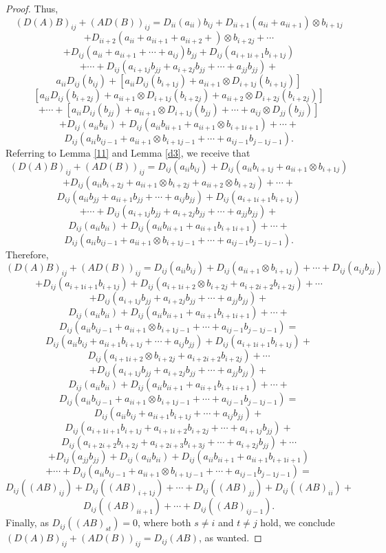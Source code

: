 \documentclass[12pt, reqno]{amsart}
\theoremstyle{definition}
\numberwithin{equation}{section}
\begin{document}
\begin{proof}
Thus, $$(D(A)B)_{ij}+(AD(B))_{ij}=D_{ii}(a_{ii})b_{ij}+D_{ii+1}(a_{ii}+a_{ii+1})\otimes b_{i+1j}$$$$+D_{ii+2}(a_{ii}+a_{ii+1}+a_{ii+2}+)\otimes b_{i+2j}+\cdots$$$$+D_{ij}(a_{ii}+a_{ii+1}+\cdots+a_{ij})b_{jj}+D_{ij}(a_{i+1i+1}b_{i+1j})$$$$+\cdots +D_{ij}(a_{i+1j}b_{jj}+a_{i+2j}b_{jj}+\cdots+a_{jj}b_{jj})+$$$$a_{ii} D_{ij}(b_{ij})+[a_{ii}  D_{ij}(b_{i+1j})+a_{ii+1}\otimes D_{i+1j}(b_{i+1j})]$$$$[a_{ii}  D_{ij}(b_{i+2j})+a_{ii+1}\otimes D_{i+1j}(b_{i+2j})+a_{ii+2}\otimes D_{i+2j}(b_ {i+2j})]$$$$+\cdots+[a_{ii}  D_{ij}(b_{jj})+a_{ii+1}\otimes D_{i+1j}(b_{jj})+\cdots+a_{ij}\otimes D_{jj}(b_{jj})]$$$$+D_{ij}(a_{ii}  b_{ii})+D_{ij}(a_{ii}  b_{ii+1}+a_{ii+1}\otimes b_{i+1i+1})+\cdots+$$$$D_{ij}(a_{ii}  b_{ij-1}+a_{ii+1}\otimes b_{i+1j-1}+\cdots + a_{ij-1}b_{j-1j-1}).$$ Referring to Lemma \ref{11} and Lemma \ref{d3}, we receive that $$(D(A)B)_{ij}+(AD(B))_{ij}=D_{ij}(a_{ii}b_{ij})+D_{ij}(a_{ii}b_{i+1j}+a_{ii+1}\otimes b_{i+1j})$$$$+D_{ij}(a_{ii} b_{i+2j}+a_{ii+1}\otimes  b_{i+2j} +a_{ii+2}\otimes  b_ {i+2j}) +\cdots+$$$$D_{ij}(a_{ii}b_{jj}+a_{ii+1}b_{jj}+\cdots+a_{ij}b_{jj})+D_{ij}(a_{i+1i+1}b_{i+1j})$$$$+\cdots +D_{ij}(a_{i+1j}b_{jj}+a_{i+2j}b_{jj}+\cdots+a_{jj}b_{jj})+$$$$D_{ij}(a_{ii}  b_{ii})+D_{ij}(a_{ii}  b_{ii+1}+a_{ii+1}b_{i+1i+1})+\cdots+$$$$D_{ij}(a_{ii}  b_{ij-1}+a_{ii+1}\otimes b_{i+1j-1}+\cdots + a_{ij-1}b_{j-1j-1}).$$ Therefore, $$(D(A)B)_{ij}+(AD(B))_{ij}=D_{ij}(a_{ii}b_{ij})+D_{ij}( a_{ii+1}\otimes b_{i+1j})+\cdots+D_{ij}( a_{ij}b_{jj})$$$$+D_{ij}(a_{i+1i+1}b_{i+1j})+D_{ij}(a_{i+1i+2}\otimes b_{i+2j}+a_{i+2i+2}b_{i+2j})+\cdots$$$$ +D_{ij}(a_{i+1j}b_{jj}+a_{i+2j}b_{jj}+\cdots+a_{jj}b_{jj})+$$$$D_{ij}(a_{ii}  b_{ii})+D_{ij}(a_{ii}  b_{ii+1}+a_{ii+1} b_{i+1i+1})+\cdots+$$$$D_{ij}(a_{ii}  b_{ij-1}+a_{ii+1}\otimes b_{i+1j-1}+\cdots + a_{ij-1}b_{j-1j-1})=$$$$D_{ij}(a_{ii}b_{ij}+ a_{ii+1}b_{i+1j}+\cdots+ a_{ij}b_{jj})+D_{ij}(a_{i+1i+1}b_{i+1j})+$$$$D_{ij}(a_{i+1i+2}\otimes b_{i+2j}+a_{i+2i+2}b_{i+2j})+\cdots$$$$ +D_{ij}(a_{i+1j}b_{jj}+a_{i+2j}b_{jj}+\cdots+a_{jj}b_{jj})+$$$$D_{ij}(a_{ii}  b_{ii})+D_{ij}(a_{ii}  b_{ii+1}+a_{ii+1}  b_{i+1i+1})+\cdots+$$$$D_{ij}(a_{ii}  b_{ij-1}+a_{ii+1}\otimes b_{i+1j-1}+\cdots + a_{ij-1}b_{j-1j-1})=$$$$D_{ij}(a_{ii}b_{ij}+ a_{ii+1}b_{i+1j}+\cdots+ a_{ij}b_{jj})+$$$$D_{ij}(a_{i+1i+1}b_{i+1j}+a_{i+1i+2}b_{i+2j}+\cdots+a_{i+1j}b_{jj})+$$$$D_{ij}(a_{i+2i+2}b_{i+2j}+a_{i+2i+3}b_{i+3j}+\cdots+a_{i+2j}b_{jj})+\cdots$$$$ +D_{ij}(a_{jj}b_{jj})+ D_{ij}(a_{ii}  b_{ii})+D_{ij}(a_{ii}  b_{ii+1}+a_{ii+1}  b_{i+1i+1})$$$$+\cdots+D_{ij}(a_{ii}  b_{ij-1}+a_{ii+1}\otimes b_{i+1j-1}+\cdots + a_{ij-1}b_{j-1j-1})=$$$$D_{ij}((AB)_{ij})+D_{ij}((AB)_{i+1j})+\cdots +D_{ij}((AB)_{jj})+D_{ij}((AB)_{ii})+$$$$D_{ij}((AB)_{ii+1})+\cdots+D_{ij}((AB)_{ij-1}).$$ Finally, as $D_{ij}((AB)_{st})=0$, where both $s\neq i$ and $t\neq j$ hold, we conclude $(D(A)B)_{ij}+(AD(B))_{ij}=D_{ij}(AB)$, as wanted.
\end{proof}
\end{document}
